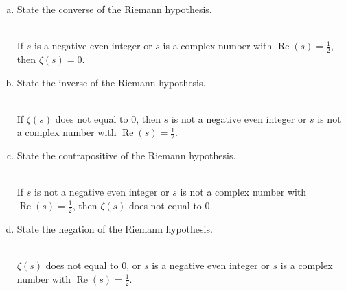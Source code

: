 \documentclass[12pt]{amsart}
\begin{document}
\begin{enumerate}[{\bfseries 1.}]
	\begin{enumerate}[(a)]
	\vspace{0.1in}
	\item State the converse of the Riemann hypothesis.
	\begin{normalize}
	    \vspace{0.1in}
	    \\If $s$ is a negative even integer or $s$ is a complex number with $\displaystyle\operatorname{Re}(s)=\frac{1}{2}$, then $\zeta(s)=0$.
	    \\
    \end{normalize}
	\item State the inverse of the Riemann hypothesis.
	\begin{normalize}
	    \vspace{0.1in}
	    \\If $\zeta(s)$ does not equal to $0$, then $s$ is not a negative even integer or $s$ is not a complex number with $\displaystyle\operatorname{Re}(s)=\frac{1}{2}$.
	    \\
    \end{normalize}
	\item State the contrapositive of the Riemann hypothesis.
	\begin{normalize}
	    \vspace{0.1in}
	    \\If $s$ is not a negative even integer or $s$ is not a complex number with $\displaystyle\operatorname{Re}(s)=\frac{1}{2}$, then $\zeta(s)$ does not equal to $0$.
	    \\
    \end{normalize}
	\item State the negation of the Riemann hypothesis.
	\begin{normalize}
	    \vspace{0.1in}
	    \\$\zeta(s)$ does not equal to $0$, or $s$ is a negative even integer or $s$ is a complex number with $\displaystyle\operatorname{Re}(s)=\frac{1}{2}$.
	    \\
    \end{normalize}
	\end{enumerate}
\end{enumerate}
\end{document}

